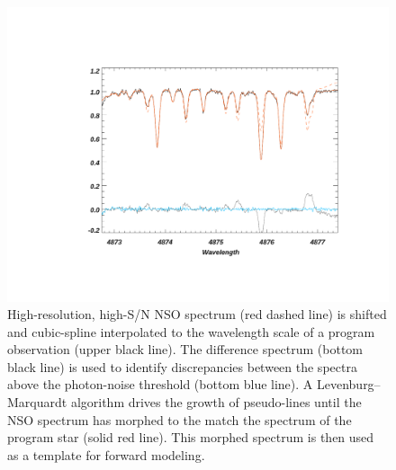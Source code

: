 \begin{figure}
    \centering
    \includegraphics[trim=5cm 3cm 3cm 4cm, clip, width=\textwidth]{figures-4/morph_fit.pdf}
    \caption{High-resolution, high-S/N NSO spectrum (red dashed line) is shifted and cubic-spline interpolated to the wavelength scale of a program observation (upper black line). The difference spectrum (bottom black line) is used to identify discrepancies between the spectra above the photon-noise threshold (bottom blue line). A Levenburg--Marquardt algorithm drives the growth of pseudo-lines until the NSO spectrum has morphed to the match the spectrum of the program star (solid red line). This morphed spectrum is then used as a template for forward modeling.}
    \label{fig:morph}
\end{figure}

